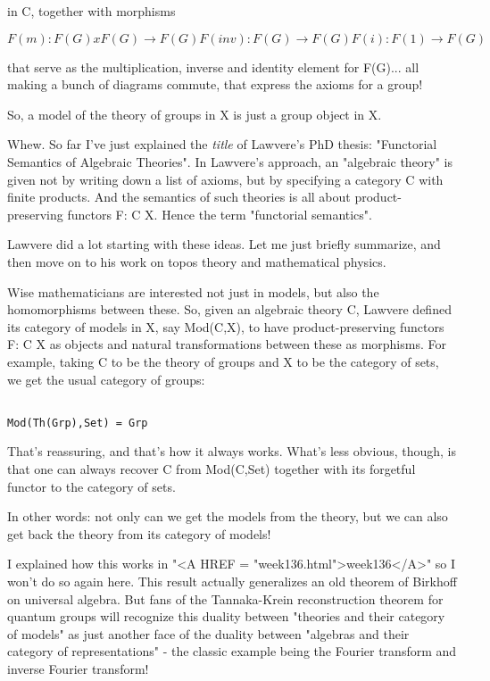 in C, together with morphisms


$$

F(m): F(G) x F(G) \to  F(G)

F(inv): F(G) \to  F(G)

F(i): F(1) \to  F(G)
$$
    
that serve as the multiplication, inverse and identity element
for F(G)... all making a bunch of diagrams commute, that express
the axioms for a group!

So, a model of the theory of groups in X is just a group object in X.

Whew.  So far I've just explained the \emph{title} of Lawvere's PhD
thesis: "Functorial Semantics of Algebraic Theories".  In
Lawvere's approach, an "algebraic theory" is given not by
writing down a list of axioms, but by specifying a category C with
finite products.  And the semantics of such theories is all about
product-preserving functors F: C \to  X.  Hence the term
"functorial semantics".

Lawvere did a lot starting with these ideas.  Let me just briefly 
summarize, and then move on to his work on topos theory and mathematical 
physics.  

Wise mathematicians are interested not just in models, but also the 
homomorphisms between these.  So, given an algebraic theory C,
Lawvere defined its category of models in X, say Mod(C,X), to have 
product-preserving functors F: C \to  X as objects and natural 
transformations between these as morphisms.  For example, taking 
C to be the theory of groups and X to be the category of sets, we get 
the usual category of groups:


\begin{verbatim}

Mod(Th(Grp),Set) = Grp
\end{verbatim}
    
That's reassuring, and that's how it always works.  What's less obvious, 
though, is that one can always recover C from Mod(C,Set) together with 
its forgetful functor to the category of sets.  

In other words: not only can we get the models from the theory, but we 
can also get back the theory from its category of models!

I explained how this works in "<A HREF =
"week136.html">week136</A>" so I won't do so again here.  This
result actually generalizes an old theorem of Birkhoff on universal
algebra.  But fans of the Tannaka-Krein reconstruction theorem for
quantum groups will recognize this duality between "theories and
their category of models" as just another face of the duality
between "algebras and their category of representations" -
the classic example being the Fourier transform and inverse Fourier
transform!

